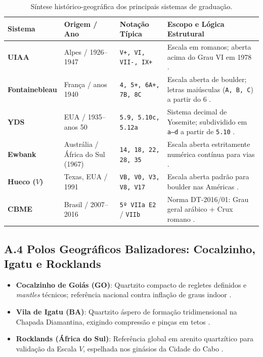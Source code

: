 \begin{table}[!htbp]
\centering
\caption{Síntese histórico-geográfica dos principais sistemas de graduação.}
\label{tab:sistemas_mundo}
\footnotesize
\renewcommand{\arraystretch}{1.12}
\begin{tabularx}{\linewidth}{p{2.2cm}p{2.3cm}p{2.4cm}X}
\toprule
\textbf{Sistema} & \textbf{Origem / Ano} & \textbf{Notação Típica} & \textbf{Escopo e Lógica Estrutural} \\
\midrule
\textbf{UIAA} & Alpes / 1926--1947 & \texttt{V+, VI, VII-, IX+} & Escala em romanos; aberta acima do Grau VI em 1978 \cite{uiaa_history}. \\
\rowcolor{rowgray}
\textbf{Fontainebleau} & França / anos 1940 & \texttt{4, 5+, 6A+, 7B, 8C} & Escala aberta de boulder; letras maiúsculas (\texttt{A, B, C}) a partir do 6 \cite{bmc_grades}. \\
\textbf{YDS} & EUA / 1935--anos 50 & \texttt{5.9, 5.10c, 5.12a} & Sistema decimal de Yosemite; subdividido em \texttt{a--d} a partir de \texttt{5.10} \cite{sportrock_grades}. \\
\rowcolor{rowgray}
\textbf{Ewbank} & Austrália / África do Sul (1967) & \texttt{14, 18, 22, 28, 35} & Escala aberta estritamente numérica contínua para vias \cite{cityrock_guide}. \\
\textbf{Hueco ($V$)} & Texas, EUA / 1991 & \texttt{VB, V0, V3, V8, V17} & Escala aberta padrão para boulder nas Américas \cite{sherman_hueco}. \\
\rowcolor{rowgray}
\textbf{CBME} & Brasil / 2007--2016 & \texttt{5º VIIa E2} / \texttt{VIIb} & Norma DT-2016/01: Grau geral arábico + Crux romano \cite{cbme_dt01}. \\
\bottomrule
\end{tabularx}
\end{table}

\subsection*{A.4 Polos Geográficos Balizadores: Cocalzinho, Igatu e Rocklands}
\begin{itemize}
    \item \textbf{Cocalzinho de Goiás (GO)}: Quartzito compacto de regletes definidos e \textit{mantles} técnicos; referência nacional contra inflação de graus indoor \cite{guia_cocalzinho, guia_ouroboulder}.
    \item \textbf{Vila de Igatu (BA)}: Quartzito áspero de formação tridimensional na Chapada Diamantina, exigindo compressão e pinças em tetos \cite{guia_igatu}.
    \item \textbf{Rocklands (África do Sul)}: Referência global em arenito quartzítico para validação da Escala $V$, espelhada nos ginásios da Cidade do Cabo \cite{cityrock_guide, goodbeta_sa}.
\end{itemize}
